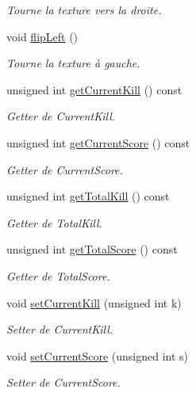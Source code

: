 \begin{DoxyCompactItemize}
\begin{DoxyCompactList}\small\item\em Tourne la texture vers la droite. \end{DoxyCompactList}\item 
void \hyperlink{class_personnage_a01ec8b39bc3052b8b47e86f2f29d14a5}{flip\+Left} ()
\begin{DoxyCompactList}\small\item\em Tourne la texture à gauche. \end{DoxyCompactList}\item 
unsigned int \hyperlink{class_personnage_ae1f499ed5540c639c974c8727b8b56d7}{get\+Current\+Kill} () const 
\begin{DoxyCompactList}\small\item\em Getter de Current\+Kill. \end{DoxyCompactList}\item 
unsigned int \hyperlink{class_personnage_ad9dcc6e0c92a08b0947a2ec4adf1add3}{get\+Current\+Score} () const 
\begin{DoxyCompactList}\small\item\em Getter de Current\+Score. \end{DoxyCompactList}\item 
unsigned int \hyperlink{class_personnage_a85ee701a050e63d79e10df70ebfb9ec1}{get\+Total\+Kill} () const 
\begin{DoxyCompactList}\small\item\em Getter de Total\+Kill. \end{DoxyCompactList}\item 
unsigned int \hyperlink{class_personnage_a1f4117a6232487b0b59fff62038a3bf2}{get\+Total\+Score} () const 
\begin{DoxyCompactList}\small\item\em Getter de Total\+Score. \end{DoxyCompactList}\item 
void \hyperlink{class_personnage_a2ace7870446cd275ecb2d83d7cc1c65c}{set\+Current\+Kill} (unsigned int k)
\begin{DoxyCompactList}\small\item\em Setter de Current\+Kill. \end{DoxyCompactList}\item 
void \hyperlink{class_personnage_a2530fa41c83f03a1d65bdc70b5baf25a}{set\+Current\+Score} (unsigned int s)
\begin{DoxyCompactList}\small\item\em Setter de Current\+Score. \end{DoxyCompactList}\item 

\end{DoxyCompactItemize}
